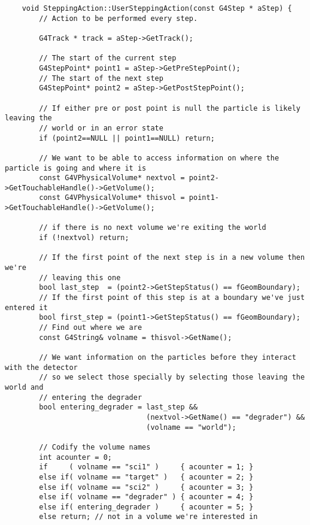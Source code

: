 \documentclass[]{article}
\begin{document}
\begin{verbatim}
    void SteppingAction::UserSteppingAction(const G4Step * aStep) {
        // Action to be performed every step.
        
        G4Track * track = aStep->GetTrack();
        
        // The start of the current step
        G4StepPoint* point1 = aStep->GetPreStepPoint();
        // The start of the next step
        G4StepPoint* point2 = aStep->GetPostStepPoint();
        
        // If either pre or post point is null the particle is likely leaving the 
        // world or in an error state
        if (point2==NULL || point1==NULL) return;
    
        // We want to be able to access information on where the particle is going and where it is
        const G4VPhysicalVolume* nextvol = point2->GetTouchableHandle()->GetVolume();
        const G4VPhysicalVolume* thisvol = point1->GetTouchableHandle()->GetVolume();
        
        // if there is no next volume we're exiting the world
        if (!nextvol) return;
        
        // If the first point of the next step is in a new volume then we're
        // leaving this one
        bool last_step  = (point2->GetStepStatus() == fGeomBoundary);
        // If the first point of this step is at a boundary we've just entered it
        bool first_step = (point1->GetStepStatus() == fGeomBoundary);
        // Find out where we are
        const G4String& volname = thisvol->GetName();
        
        // We want information on the particles before they interact with the detector
        // so we select those specially by selecting those leaving the world and
        // entering the degrader 
        bool entering_degrader = last_step &&
                                 (nextvol->GetName() == "degrader") &&
                                 (volname == "world");

        // Codify the volume names
        int acounter = 0; 
        if     ( volname == "sci1" )     { acounter = 1; } 
        else if( volname == "target" )   { acounter = 2; } 
        else if( volname == "sci2" )     { acounter = 3; }
        else if( volname == "degrader" ) { acounter = 4; }
        else if( entering_degrader )     { acounter = 5; }
        else return; // not in a volume we're interested in
        

\end{verbatim}
\end{document}
